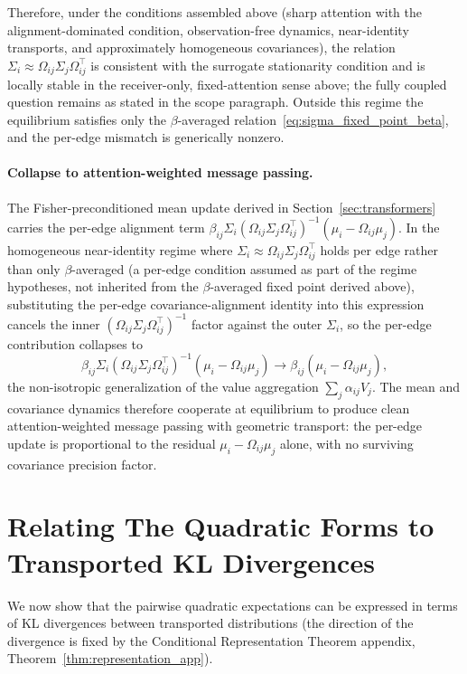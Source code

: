 \documentclass[11pt]{article}
\begin{document}
Therefore, under the conditions assembled above (sharp attention with the alignment-dominated condition, observation-free dynamics, near-identity transports, and approximately homogeneous covariances), the relation $\Sigma_i \approx\Omega_{ij}\Sigma_j\Omega_{ij}^\top$ is consistent with the surrogate stationarity condition and is locally stable in the receiver-only, fixed-attention sense above; the fully coupled question remains as stated in the scope paragraph. Outside this regime the equilibrium satisfies only the $\beta$-averaged relation~\eqref{eq:sigma_fixed_point_beta}, and the per-edge mismatch is generically nonzero.

\paragraph{Collapse to attention-weighted message passing.}
The Fisher-preconditioned mean update derived in Section~\ref{sec:transformers} carries the per-edge alignment term $\beta_{ij} \Sigma_i (\Omega_{ij}\Sigma_j\Omega_{ij}^\top)^{-1}(\mu_i - \Omega_{ij}\mu_j)$. In the homogeneous near-identity regime where $\Sigma_i \approx \Omega_{ij}\Sigma_j\Omega_{ij}^\top$ holds per edge rather than only $\beta$-averaged (a per-edge condition assumed as part of the regime hypotheses, not inherited from the $\beta$-averaged fixed point derived above), substituting the per-edge covariance-alignment identity into this expression cancels the inner $(\Omega_{ij}\Sigma_j\Omega_{ij}^\top)^{-1}$ factor against the outer $\Sigma_i$, so the per-edge contribution collapses to
\begin{equation}
\beta_{ij} \Sigma_i (\Omega_{ij}\Sigma_j\Omega_{ij}^\top)^{-1}(\mu_i - \Omega_{ij}\mu_j) \longrightarrow \beta_{ij}(\mu_i - \Omega_{ij}\mu_j),
\end{equation}
the non-isotropic generalization of the value aggregation $\sum_j \alpha_{ij} V_j$. The mean and covariance dynamics therefore cooperate at equilibrium to produce clean attention-weighted message passing with geometric transport: the per-edge update is proportional to the residual $\mu_i - \Omega_{ij}\mu_j$ alone, with no surviving covariance precision factor.

\section{Relating The Quadratic Forms to Transported KL Divergences}
We now show that the pairwise quadratic expectations can be expressed in terms of KL divergences between transported distributions (the direction of the divergence is fixed by the Conditional Representation Theorem appendix, Theorem~\ref{thm:representation_app}).
\end{document}
